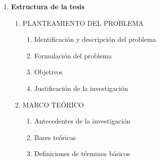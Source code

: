 \documentclass[12pt,a4paper]{article}
\begin{document}
\begin{enumerate}
	\item \textbf{Estructura de la tesis \flushbottom }
	      \begin{enumerate}
		      \item PLANTEAMIENTO DEL PROBLEMA
		            \begin{enumerate}
			            \item Identificación y descripción del problema
			            \item Formulación del problema
			            \item Objetivos
			            \item Justificación de la investigación
		            \end{enumerate}
		      \item MARCO TEÓRICO
		            \begin{enumerate}
			            \item Antecedentes de la investigación
			            \item Bases teóricas
			            \item Definiciones de términos básicos
		            \end{enumerate}

\end{enumerate}
\end{enumerate}
\end{document}
